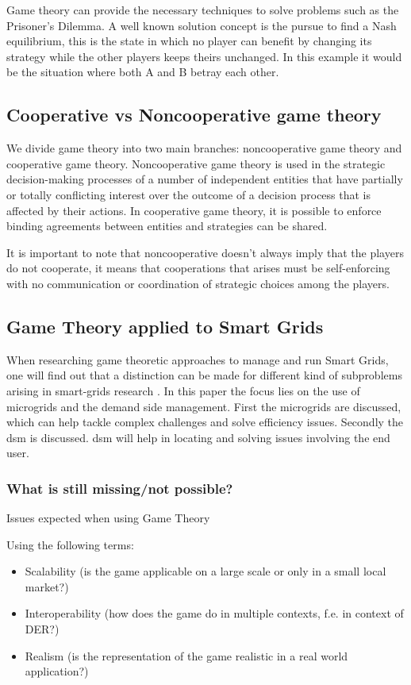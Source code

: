 Game theory can provide the necessary techniques to solve problems such as the Prisoner's Dilemma. A well known solution concept is the pursue to find a Nash equilibrium, this is the state in which no player can benefit by changing its strategy while the other players keeps theirs unchanged. In this example it would be the situation where both A and B betray each other.

\subsection{Cooperative vs Noncooperative game theory}
We divide game theory into two main branches: noncooperative game theory and cooperative game theory. Noncooperative game theory is used in the strategic decision-making processes of a number of independent entities that have partially or totally conflicting interest over the outcome of a decision process that is affected by their actions\cite{keypaper}. In cooperative game theory, it is possible to enforce binding agreements between entities and strategies can be shared. 

It is important to note that noncooperative doesn't always imply that the players do not cooperate, it means that cooperations that arises must be self-enforcing with no communication or coordination of strategic choices among the players.\cite{keypaper}


\subsection{Game Theory applied to Smart Grids}
When researching game theoretic approaches to manage and run Smart Grids, one will find out that a distinction can be made for different kind of subproblems arising in smart-grids research \cite{keypaper}. In this paper the focus lies on the use of microgrids and the demand side management. First the microgrids are discussed, which can help tackle complex challenges and solve efficiency issues. Secondly the \gls{dsm} is discussed. \gls{dsm} will help in locating and solving issues involving the end user. 


\subsubsection{What is still missing/not possible?}

Issues expected when using Game Theory

Using the following terms:
\begin{itemize}
	\item Scalability (is the game applicable on a large scale or only in a small local market?)
	\item Interoperability (how does the game do in multiple contexts, f.e. in context of DER?)
	\item Realism (is the representation of the game realistic in a real world application?)
\end{itemize}
